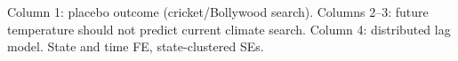 \begin{table}[htbp]
   \par \raggedright 
   Column 1: placebo outcome (cricket/Bollywood search). Columns 2--3: future temperature should not predict current climate search. Column 4: distributed lag model. State and time FE, state-clustered SEs.
\end{table}


